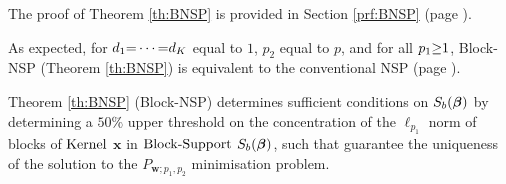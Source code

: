 \newpage
The proof of Theorem \ref{th:BNSP} is provided in Section \ref{prf:BNSP} (page \pageref{prf:BNSP}).

As expected, for $d_1 {=} \cdots {=} d_K$ equal to $1$, $p_2$ equal to $p$, and for all $p_1 {\geq} 1$, Block-NSP (Theorem \ref{th:BNSP}) is equivalent to the conventional NSP (page \pageref{txt:NSP}).

Theorem \ref{th:BNSP} (Block-NSP) determines sufficient conditions on $S_b(\boldsymbol{\beta})$ by determining a $50\%$ upper threshold on the concentration of the $\ell_{p_1}$ norm of blocks of $\mathrm{Kernel}$ $\boldsymbol{x}$ in $\mathrm{Block\text{{-}}Support}$ $S_b(\boldsymbol{\beta})$, such that guarantee the uniqueness of the solution to the $P_{\boldsymbol{w};p_1,p_2}$ minimisation problem.